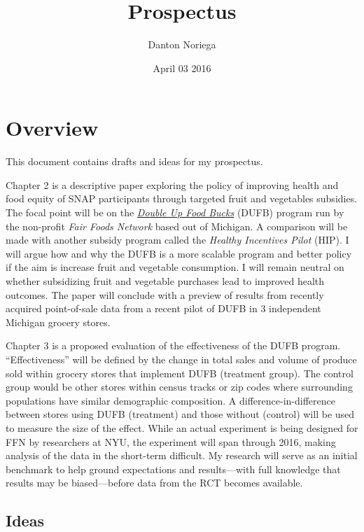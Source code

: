 \documentclass[11pt,letterpaper,]{book}
\title{Prospectus}
\author{Danton Noriega}
\date{April 03 2016}
\begin{document}
\maketitle

{
\setcounter{tocdepth}{1}
\tableofcontents
}
\chapter{Overview}\label{index}

This document contains drafts and ideas for my prospectus.

Chapter 2 is a descriptive paper exploring the policy of improving
health and food equity of SNAP participants through targeted fruit and
vegetables subsidies. The focal point will be on the
\href{http://www.doubleupfoodbucks.org/}{\emph{Double Up Food Bucks}}
(DUFB) program run by the non-profit \emph{Fair Foods Network} based out
of Michigan. A comparison will be made with another subsidy program
called the \emph{Healthy Incentives Pilot} (HIP). I will argue how and
why the DUFB is a more scalable program and better policy if the aim is
increase fruit and vegetable consumption. I will remain neutral on
whether subsidizing fruit and vegetable purchases lead to improved
health outcomes. The paper will conclude with a preview of results from
recently acquired point-of-sale data from a recent pilot of DUFB in 3
independent Michigan grocery stores.

Chapter 3 is a proposed evaluation of the effectiveness of the DUFB
program. ``Effectiveness'' will be defined by the change in total sales
and volume of produce sold within grocery stores that implement DUFB
(treatment group). The control group would be other stores within census
tracks or zip codes where surrounding populations have similar
demographic composition. A difference-in-difference between stores using
DUFB (treatment) and those without (control) will be used to measure the
size of the effect. While an actual experiment is being designed for FFN
by researchers at NYU, the experiment will span through 2016, making
analysis of the data in the short-term difficult. My research will serve
as an initial benchmark to help ground expectations and results---with
full knowledge that results may be biased---before data from the RCT
becomes available.

\section{Ideas}\label{ideas}
\end{document}
